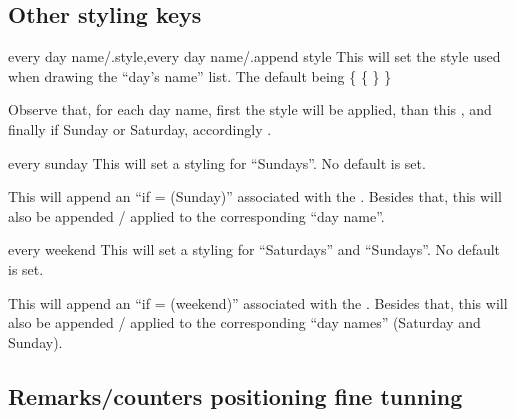 \documentclass{article}
\begin{document}
\subsection{Other styling keys}
\begin{codedescribe}[key]{every day name/.style,every day name/.append style}
This will set the style used when drawing the ``day's name'' list. The default being \{  \{  \} \}
\end{codedescribe}

\begin{tsremark}
Observe that, for each day name, first the  style will be applied, than this , and finally  if Sunday or Saturday, accordingly .
\end{tsremark}


\begin{codedescribe}[key]{every sunday}
This will set a styling for ``Sundays''. No default is set.
\end{codedescribe}

\begin{tsremark}
This will append an ``if = (Sunday)'' associated with the . Besides that, this will also be appended / applied to the corresponding ``day name''. 
\end{tsremark}

\begin{codedescribe}[key]{every weekend}
This will set a styling for ``Saturdays'' and ``Sundays''. No default is set.
\end{codedescribe}

\begin{tsremark}
This will append an ``if = (weekend)'' associated with the . Besides that, this will also be appended / applied to the corresponding ``day names'' (Saturday and Sunday). 
\end{tsremark}


\subsection{Remarks/counters positioning fine tunning}
\end{document}
